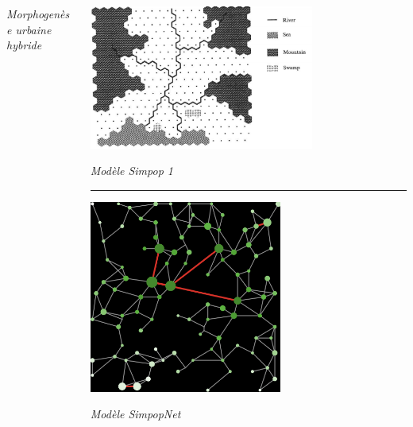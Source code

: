 \documentclass[english,11pt]{beamer}
\begin{document}
{\begin{columns}
\begin{column}{0.5\textwidth}
	\footnotesize
\textit{Morphogenèse urbaine hybride \cite{raimbault2014hybrid}}
	

	\end{column}
	\vrule{}
	\begin{column}{0.5\textwidth}
	\centering
	
	\includegraphics[width=0.7\textwidth]{figures/simpop1.png}
	
	\footnotesize
\textit{Modèle Simpop 1 \cite{sanders1997simpop}}

	\medskip

	\hrule
	
	\medskip

	\includegraphics[width=0.6\textwidth]{figures/setup_synth_1_tick100.png}
	
	\footnotesize
	\textit{Modèle SimpopNet \cite{schmitt2014modelisation}}
	
	\end{column}


\end{columns}

}
\end{document}
